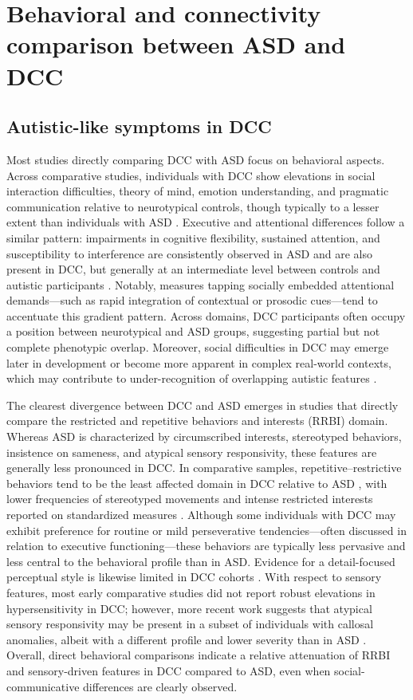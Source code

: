 \documentclass{article}
\begin{document}
\section{Behavioral and connectivity comparison between ASD and DCC}

\subsection{Autistic-like symptoms in DCC}

Most studies directly comparing DCC with ASD focus on behavioral aspects. Across comparative studies, individuals with DCC show elevations in social interaction difficulties, theory of mind, emotion understanding, and pragmatic communication relative to neurotypical controls, though typically to a lesser extent than individuals with ASD \citep{Badaruddin2007,Lau2013}. Executive and attentional differences follow a similar pattern: impairments in cognitive flexibility, sustained attention, and susceptibility to interference are consistently observed in ASD and are also present in DCC, but generally at an intermediate level between controls and autistic participants \citep{Badaruddin2007,Paul2014}. Notably, measures tapping socially embedded attentional demands—such as rapid integration of contextual or prosodic cues—tend to accentuate this gradient pattern. Across domains, DCC participants often occupy a position between neurotypical and ASD groups, suggesting partial but not complete phenotypic overlap. Moreover, social difficulties in DCC may emerge later in development or become more apparent in complex real-world contexts, which may contribute to under-recognition of overlapping autistic features \citep{Booth2018}.

The clearest divergence between DCC and ASD emerges in studies that directly compare the restricted and repetitive behaviors and interests (RRBI) domain. Whereas ASD is characterized by circumscribed interests, stereotyped behaviors, insistence on sameness, and atypical sensory responsivity, these features are generally less pronounced in DCC. In comparative samples, repetitive–restrictive behaviors tend to be the least affected domain in DCC relative to ASD \citep{Badaruddin2007}, with lower frequencies of stereotyped movements and intense restricted interests reported on standardized measures \citep{Lau2013}. Although some individuals with DCC may exhibit preference for routine or mild perseverative tendencies—often discussed in relation to executive functioning—these behaviors are typically less pervasive and less central to the behavioral profile than in ASD. Evidence for a detail-focused perceptual style is likewise limited in DCC cohorts \citep{Booth2018}. With respect to sensory features, most early comparative studies did not report robust elevations in hypersensitivity in DCC; however, more recent work suggests that atypical sensory responsivity may be present in a subset of individuals with callosal anomalies, albeit with a different profile and lower severity than in ASD \citep{Demopoulos2015}. Overall, direct behavioral comparisons indicate a relative attenuation of RRBI and sensory-driven features in DCC compared to ASD, even when social-communicative differences are clearly observed.
\end{document}
